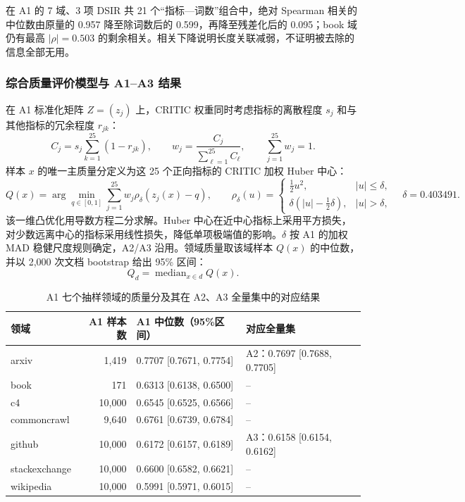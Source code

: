 在 A1 的 7 域、3 项 DSIR 共 21 个“指标—词数”组合中，绝对 Spearman 相关的中位数由原量的 0.957 降至除词数后的 0.599，再降至残差化后的 0.095；book 域仍有最高 $|\rho|=0.503$ 的剩余相关。相关下降说明长度关联减弱，不证明被去除的信息全部无用。

\subsubsection{综合质量评价模型与 A1--A3 结果}

在 A1 标准化矩阵 $Z=(z_j)$ 上，CRITIC 权重同时考虑指标的离散程度 $s_j$ 和与其他指标的冗余程度 $r_{jk}$：
\begin{equation}
C_j=s_j\sum_{k=1}^{25}(1-r_{jk}),\qquad
w_j=\frac{C_j}{\sum_{\ell=1}^{25}C_\ell},\qquad
\sum_{j=1}^{25}w_j=1.
\label{eq:critic}
\end{equation}
样本 $x$ 的唯一主质量分定义为这 25 个正向指标的 CRITIC 加权 Huber 中心：
\begin{equation}
Q(x)=\arg\min_{q\in[0,1]}
\sum_{j=1}^{25}w_j\rho_{\delta}\!\left(z_j(x)-q\right),\qquad
\rho_{\delta}(u)=
\begin{cases}
\frac{1}{2}u^2,& |u|\leq\delta,\\
\delta\left(|u|-\frac{1}{2}\delta\right),& |u|>\delta,
\end{cases}
\quad \delta=0.403491.
\label{eq:q1_huber}
\end{equation}
该一维凸优化用导数方程二分求解。Huber 中心在近中心指标上采用平方损失，对少数远离中心的指标采用线性损失，降低单项极端值的影响。$\delta$ 按 A1 的加权 MAD 稳健尺度规则确定，A2/A3 沿用。领域质量取该域样本 $Q(x)$ 的中位数，并以 2{,}000 次文档 bootstrap 给出 95\% 区间：
\begin{equation}
Q_d=\operatorname{median}_{x\in d}Q(x).
\label{eq:q1_domain}
\end{equation}

\begin{table}[H]
\centering\small
\caption{A1 七个抽样领域的质量分及其在 A2、A3 全量集中的对应结果}
\label{tab:q1_domain_quality}
\begin{tabular}{@{}lrp{5.0cm}p{4.5cm}@{}}
\toprule
领域 & A1 样本数 & A1 中位数（95\%区间） & 对应全量集\\
\midrule
arxiv & 1{,}419 & 0.7707 [0.7671, 0.7754] & A2：0.7697 [0.7688, 0.7705]\\
book & 171 & 0.6313 [0.6138, 0.6500] & --\\
c4 & 10{,}000 & 0.6545 [0.6525, 0.6566] & --\\
commoncrawl & 9{,}640 & 0.6761 [0.6739, 0.6784] & --\\
github & 10{,}000 & 0.6172 [0.6157, 0.6189] & A3：0.6158 [0.6154, 0.6162]\\
stackexchange & 10{,}000 & 0.6600 [0.6582, 0.6621] & --\\
wikipedia & 10{,}000 & 0.5991 [0.5971, 0.6015] & --\\
\bottomrule
\end{tabular}
\end{table}

